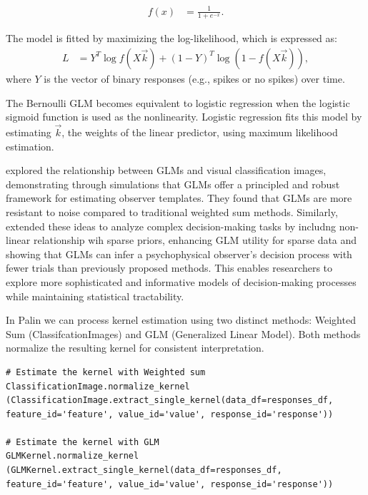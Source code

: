\begin{align}
f(x) &= \frac{1}{1 + e^{-x}}.
\end{align}

The model is fitted by maximizing the log-likelihood, which is expressed as:
\begin{align}
L &= Y^T \log f(X \vec{k}) + (1 - Y)^T \log(1 - f(X \vec{k})),
\end{align}
where $Y$ is the vector of binary responses (e.g., spikes or no spikes) over time.

The Bernoulli GLM becomes equivalent to logistic regression when the logistic sigmoid function is used as the nonlinearity. Logistic regression fits this model by estimating $\vec{k}$, the weights of the linear predictor, using maximum likelihood estimation. \cite{pillow_spatio-temporal_2008}

\cite{knoblauch_classification_2008} explored the relationship between GLMs and visual classification images, demonstrating through simulations that GLMs offer a principled and robust framework for estimating observer templates. They found that GLMs are more resistant to noise compared to traditional weighted sum methods. Similarly, \cite{mineault_improved_2009} extended these ideas to analyze complex decision-making tasks by includng non-linear relationship wih sparse priors, enhancing GLM utility for sparse data and showing that GLMs can infer a psychophysical observer’s decision process with fewer trials than previously proposed methods. This enables researchers to explore more sophisticated and informative models of decision-making processes while maintaining statistical tractability.

\begin{tcolorbox}[title=Palin Toolbox: Estimating Kernel,
    colback=white!30!white, colframe=blue!80!white]
In Palin we can process kernel estimation using two distinct methods: Weighted Sum (ClassifcationImages) and GLM (Generalized Linear Model). Both methods normalize the resulting kernel for consistent interpretation.
\tcblower

\begin{verbatim}
# Estimate the kernel with Weighted sum  
ClassificationImage.normalize_kernel
(ClassificationImage.extract_single_kernel(data_df=responses_df, 
feature_id='feature', value_id='value', response_id='response'))

# Estimate the kernel with GLM 
GLMKernel.normalize_kernel
(GLMKernel.extract_single_kernel(data_df=responses_df, 
feature_id='feature', value_id='value', response_id='response'))
\end{verbatim}

\end{tcolorbox}


